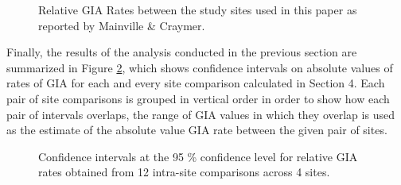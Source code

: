 \begin{figure}[h]
	\caption{Relative GIA Rates between the study sites used in this paper as reported by Mainville \& Craymer.}
	\label{fig:craymerGIARates}
\end{figure}
\newpage



Finally, the results of the analysis conducted in the previous section are summarized in
Figure \ref{fig:intervalsGIA}, which shows confidence intervals on absolute values of
rates of GIA for each and every site comparison calculated in Section 4. Each
pair of site comparisons is grouped in vertical order in order to show how each pair
of intervals overlaps, the range of GIA values in which they overlap is used as
the estimate of the absolute value GIA rate between the given pair of sites.

\newpage

\begin{figure}[H]
	\caption{Confidence intervals at the 95 \% confidence level for relative GIA rates obtained from 12 intra-site comparisons across 4 sites.}
	\label{fig:intervalsGIA}
\end{figure}

